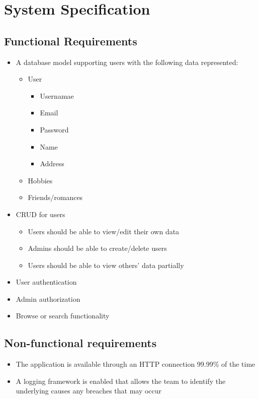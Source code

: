 \documentclass[a4paper]{article}
\begin{document}
\section{System Specification}

\subsection{Functional Requirements}
\begin{itemize}
\item A database model supporting users with the following data represented:
  \begin{itemize}
  \item User
      \begin{itemize}
      \item Usernamae
      \item Email
      \item Password
      \item Name
      \item Address
      \end{itemize}
  \item Hobbies
  \item Friends/romances
  \end{itemize}
\item CRUD for users
	\begin{itemize}
    \item Users should be able to view/edit their own data
    \item Admins should be able to create/delete users
    \item Users should be able to view others' data partially
    \end{itemize}
\item User authentication
\item Admin authorization
\item Browse or search functionality
\end{itemize}

\subsection{Non-functional requirements}
\begin{itemize}
\item The application is available through an HTTP connection 99.99\% of the time
\item A logging framework is enabled that allows the team to identify the underlying causes any breaches that may occur
\end{itemize}
\end{document}
